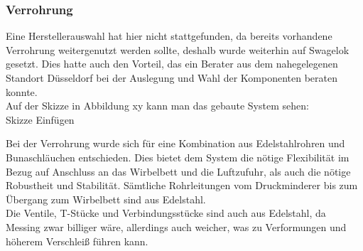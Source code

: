 \subsubsection{Verrohrung}

Eine Herstellerauswahl hat hier nicht stattgefunden, da bereits vorhandene Verrohrung weitergenutzt werden sollte, deshalb wurde weiterhin auf Swagelok gesetzt. Dies hatte auch den Vorteil, das ein Berater aus dem nahegelegenen Standort Düsseldorf bei der Auslegung und Wahl der Komponenten beraten konnte. \\
Auf der Skizze in Abbildung xy kann man das gebaute System sehen:
\hfill \\

Skizze Einfügen


Bei der Verrohrung wurde sich für eine Kombination aus Edelstahlrohren und Bunaschläuchen entschieden. Dies bietet dem System die nötige Flexibilität im Bezug auf Anschluss an das Wirbelbett und die Luftzufuhr, als auch die nötige Robustheit und Stabilität. Sämtliche Rohrleitungen vom Druckminderer bis zum Übergang zum Wirbelbett sind aus Edelstahl. \\
Die Ventile, T-Stücke und Verbindungsstücke sind auch aus Edelstahl, da Messing zwar billiger wäre, allerdings auch weicher, was zu Verformungen und höherem Verschleiß führen kann.













